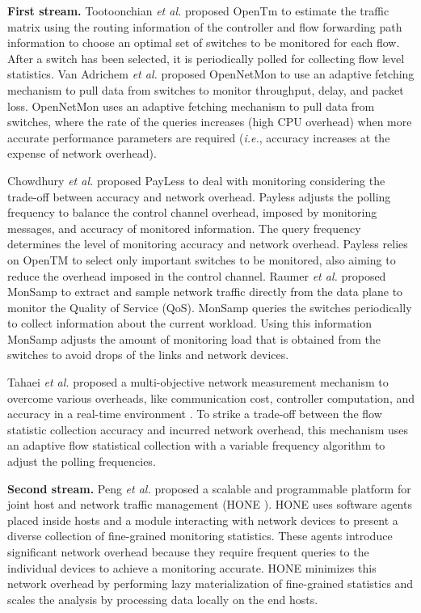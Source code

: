 \textbf{First stream.}
Tootoonchian \textit{et al.} proposed OpenTm \cite{Tootoonchian_2010:opentm} to estimate the traffic matrix using the routing information of the controller and flow forwarding path information to choose an optimal set of switches to be monitored for each flow. After a switch has been selected, it is periodically polled for collecting flow level statistics. Van Adrichem \textit{et al.} proposed OpenNetMon \cite{van_2014:OpenNetMon} to use an adaptive fetching mechanism to pull data from switches to monitor throughput, delay, and packet loss. OpenNetMon uses an adaptive fetching mechanism to pull data from switches, where the rate of the queries increases (high CPU overhead) when more accurate performance parameters are required (\textit{i.e.}, accuracy increases at the expense of network overhead).

Chowdhury \textit{et al.} proposed PayLess \cite{chowdhury_2014:payless} to deal with monitoring considering the trade-off between accuracy and network overhead. Payless adjusts the polling frequency to balance the control channel overhead, imposed by monitoring messages, and accuracy of monitored information. The query frequency determines the level of monitoring accuracy and network overhead. Payless relies on OpenTM \cite{Tootoonchian_2010:opentm} to select only important switches to be monitored, also aiming to reduce the overhead imposed in the control channel. Raumer \textit{et al.} proposed MonSamp \cite{raumer_2014:monsamp} to extract and sample network traffic directly from the data plane to monitor the Quality of Service (QoS). MonSamp queries the switches periodically to collect information about the current workload. Using this information MonSamp adjusts the amount of monitoring load that is obtained from the switches to avoid drops of the links and network devices.

Tahaei \textit{et al.} proposed a multi-objective network measurement mechanism to overcome various overheads, like communication cost, controller computation, and accuracy in a real-time environment \cite{tahaei_2017:multi-objective}. To strike a trade-off between the flow statistic collection accuracy and incurred network overhead, this mechanism uses an adaptive flow statistical collection with a variable frequency algorithm to adjust the polling frequencies.

\textbf{Second stream.}
Peng \textit{et al.} proposed a scalable and programmable platform for joint host and network traffic management (HONE \cite{Sun_2015:HONE}). HONE uses software agents placed inside hosts and a module interacting with network devices to present a diverse collection of fine-grained monitoring statistics. These agents introduce significant network overhead because they require frequent queries to the individual devices to achieve a monitoring accurate. HONE minimizes this network overhead by performing lazy materialization of fine-grained statistics and scales the analysis by processing data locally on the end hosts.

